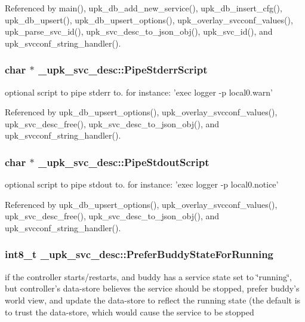 Referenced by main(), upk\_\-db\_\-add\_\-new\_\-service(), upk\_\-db\_\-insert\_\-cfg(), upk\_\-db\_\-upsert(), upk\_\-db\_\-upsert\_\-options(), upk\_\-overlay\_\-svcconf\_\-values(), upk\_\-parse\_\-svc\_\-id(), upk\_\-svc\_\-desc\_\-to\_\-json\_\-obj(), upk\_\-svc\_\-id(), and upk\_\-svcconf\_\-string\_\-handler().

\subsubsection[{PipeStderrScript}]{\setlength{\rightskip}{0pt plus 5cm}char $\ast$ {\bf \_\-upk\_\-svc\_\-desc::PipeStderrScript}}\label{struct__upk__svc__desc_a10e6db4c4a683259d4bf402f76389376}
optional script to pipe stderr to. for instance: 'exec logger -\/p local0.warn' 

Referenced by upk\_\-db\_\-upsert\_\-options(), upk\_\-overlay\_\-svcconf\_\-values(), upk\_\-svc\_\-desc\_\-free(), upk\_\-svc\_\-desc\_\-to\_\-json\_\-obj(), and upk\_\-svcconf\_\-string\_\-handler().

\subsubsection[{PipeStdoutScript}]{\setlength{\rightskip}{0pt plus 5cm}char $\ast$ {\bf \_\-upk\_\-svc\_\-desc::PipeStdoutScript}}\label{struct__upk__svc__desc_a2f4ec4892314d72d390a37f3391e9336}
optional script to pipe stdout to. for instance: 'exec logger -\/p local0.notice' 

Referenced by upk\_\-db\_\-upsert\_\-options(), upk\_\-overlay\_\-svcconf\_\-values(), upk\_\-svc\_\-desc\_\-free(), upk\_\-svc\_\-desc\_\-to\_\-json\_\-obj(), and upk\_\-svcconf\_\-string\_\-handler().

\subsubsection[{PreferBuddyStateForRunning}]{\setlength{\rightskip}{0pt plus 5cm}int8\_\-t {\bf \_\-upk\_\-svc\_\-desc::PreferBuddyStateForRunning}}\label{struct__upk__svc__desc_a73d367dc1b45f564243e23297bc39831}
if the controller starts/restarts, and buddy has a service state set to \char`\"{}running\char`\"{}, but controller's data-\/store believes the service should be stopped, prefer buddy's world view, and update the data-\/store to reflect the running state (the default is to trust the data-\/store, which would cause the service to be stopped 

